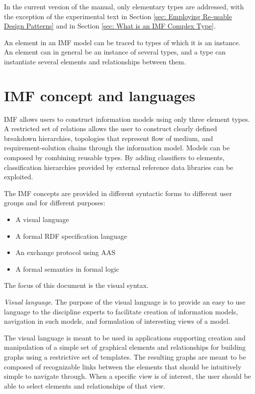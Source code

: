 \documentclass[../main.tex]{subfiles}
\begin{document}
In the current version of the manual, only elementary types are addressed, with the exception of the experimental text in Section \ref{sec: Employing Re-usable Design Patterns} and in Section   \ref{sec: What is an IMF Complex Type}. 

An element in an IMF model can be traced to types of which it is an instance. An element can in general be an instance of several types, and a type can instantiate several elements and relationships between them. 


\section{IMF concept and languages}
\label{sec:IMFconceptAndLanguages}

IMF allows users to construct information models using only three
element types. A restricted set of relations allows the user to
construct clearly defined breakdown hierarchies, topologies that
represent flow of medium, and requirement-solution chains through the
information model. Models can be composed by combining reusable types. By adding classifiers to elements,
classification hierarchies provided by external reference data
libraries can be exploited.

The IMF concepts are provided in different syntactic forms to
different user groups and for different purposes:

\begin{itemize}
    \item A visual language
    \item A formal RDF specification language
    \item An exchange protocol using AAS
    \item A formal semantics in formal logic
\end{itemize}

The focus of this document is the visual syntax.

\textit{Visual language}. The purpose of the visual language is to provide an easy to use
language to the discipline experts to facilitate creation of
information models, navigation in such models, and formulation of
interesting views of a model.

The visual language is meant to be used in applications supporting
creation and manipulation of a simple set of graphical elements and
relationships for building graphs using a restrictive set of templates.
The resulting graphs are meant to be composed of recognizable links
between the elements that should be intuitively simple to navigate
through. When a specific view is of interest, the user should be
able to select elements and relationships of that view.
 
\end{document}
